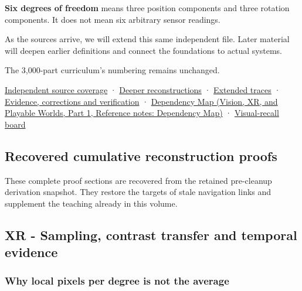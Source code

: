 \textbf{Six degrees of freedom} means three position components and three rotation components. It does not mean six arbitrary sensor readings.

As the sources arrive, we will extend this same independent file. Later material will deepen earlier definitions and connect the foundations to actual systems.

The 3,000-part curriculum's numbering remains unchanged.

\hyperref[appendix-fd090d982a15-xr01---independent-seeing-and-representation-source]{Independent source coverage} · \hyperref[04-visual-computing-ii-ch042-xr---sampling-contrast-transfer-and-temporal-evidence]{Deeper reconstructions} · \hyperref[appendix-92ff77d4dfdc-xr---from-geometry-to-sample-loss-and-evidence]{Extended traces} · \hyperref[appendix-a103e7846d21-xr01---seeing-and-representing-reality]{Evidence, corrections and verification} · \href{../07-Vision-XR-and-Playable-Worlds-P01/main.pdf\#nameddest=appendix-4ad47bdd269a}{Dependency Map (Vision, XR, and Playable Worlds, Part 1, Reference notes: Dependency Map)} · \hyperref[appendix-73c6b8ed5a87]{Visual-recall board}

\subsection{Recovered cumulative reconstruction proofs}\label{04-visual-computing-ii-ch042-recovered-cumulative-reconstruction-proofs}

\hypertarget{04-visual-computing-ii-ch042-recovered-cumulative-reconstruction-proofs}{}

These complete proof sections are recovered from the retained pre-cleanup derivation snapshot. They restore the targets of stale navigation links and supplement the teaching already in this volume.

\subsection{XR - Sampling, contrast transfer and temporal evidence}\label{04-visual-computing-ii-ch042-xr---sampling-contrast-transfer-and-temporal-evidence}

\hypertarget{04-visual-computing-ii-ch042-xr---sampling-contrast-transfer-and-temporal-evidence}{}

\subsubsection{Why local pixels per degree is not the average}\label{04-visual-computing-ii-ch042-why-local-pixels-per-degree-is-not-the-average}


